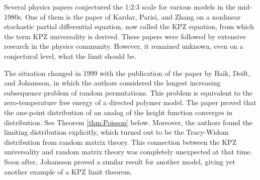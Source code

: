 \documentclass[10pt]{article}
\theoremstyle{plain}
\theoremstyle{definition}
\numberwithin{equation}{section}
\begin{document}

Several physics papers \cite{Kardar-Parisi-Zhang86, Forster-Nelson-Stephen77, vanBeijeren-Kutner-Spohn85, Huse-Henley85} conjectured the 1:2:3 scale for various models in the mid-1980s. 
One of them is the paper \cite{Kardar-Parisi-Zhang86} of Kardar, Parisi, and Zhang on a nonlinear stochastic partial differential equation, now called the KPZ equation, from which the term KPZ universality is derived. 
These papers were followed by extensive research in the physics community. 
However, it remained unknown, even on a conjectural level, what the limit should be. 


The situation changed in 1999 with the publication of the paper \cite{Baik-Deift-Johansson99} by 
Baik, Deift, and Johansson, in which the authors considered the longest increasing subsequence problem of random permutations. 
This problem is equivalent to the zero-temperature free energy of a directed polymer model. 
The paper proved that the one-point distribution of an analog of the height function converges in distribution. 
See Theorem \ref{thm:Poisson} below. 
Moreover, the authors found the limiting distribution explicitly, which turned out to be the Tracy-Widom distribution from random matrix theory. 
This connection between the KPZ universality and random matrix theory was completely unexpected at that time. 
Soon after, Johansson \cite{Johansson00}  proved a similar result for another model, giving yet another example of a KPZ limit theorem. 
\end{document}

